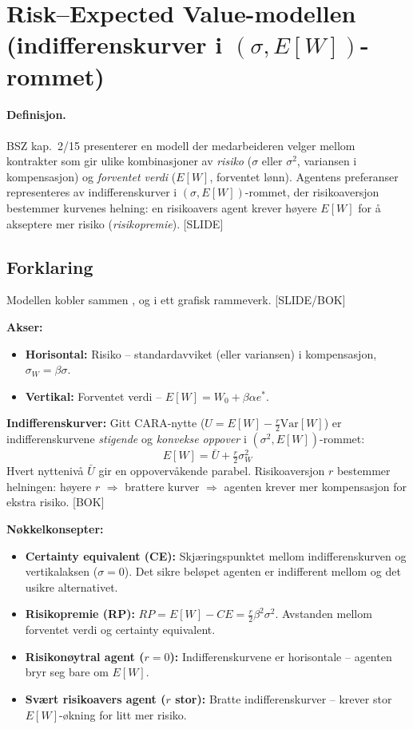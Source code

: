 \section{Risk--Expected Value-modellen (indifferenskurver i $(\sigma, E[W])$-rommet)}\label{thr:risk-expected-value-model}

\paragraph{Definisjon.} BSZ kap.\ 2/15 presenterer en modell der medarbeideren velger mellom kontrakter som gir ulike kombinasjoner av \emph{risiko} ($\sigma$ eller $\sigma^2$, variansen i kompensasjon) og \emph{forventet verdi} ($E[W]$, forventet lønn). Agentens preferanser representeres av indifferenskurver i $(\sigma, E[W])$-rommet, der risikoaversjon bestemmer kurvenes helning: en risikoavers agent krever høyere $E[W]$ for å akseptere mer risiko (\emph{risikopremie}). [SLIDE]

\subsection*{Forklaring}

Modellen kobler sammen ,  og  i ett grafisk rammeverk. [SLIDE/BOK]

\textbf{Akser:}
\begin{itemize}\setlength{\itemsep}{1pt}
\item \textbf{Horisontal:} Risiko -- standardavviket (eller variansen) i kompensasjon, $\sigma_W = \beta\sigma$.
\item \textbf{Vertikal:} Forventet verdi -- $E[W] = W_0 + \beta\alpha e^*$.
\end{itemize}

\textbf{Indifferenskurver:} Gitt CARA-nytte ($U = E[W] - \tfrac{r}{2}\mathrm{Var}[W]$) er indifferenskurvene \emph{stigende} og \emph{konvekse oppover} i $(\sigma^2, E[W])$-rommet:
\[
E[W] = \bar{U} + \tfrac{r}{2}\sigma_W^2
\]
Hvert nyttenivå $\bar{U}$ gir en oppovervåkende parabel. Risikoaversjon $r$ bestemmer helningen: høyere $r$ $\Rightarrow$ brattere kurver $\Rightarrow$ agenten krever mer kompensasjon for ekstra risiko. [BOK]

\textbf{Nøkkelkonsepter:}
\begin{itemize}\setlength{\itemsep}{2pt}
\item \textbf{Certainty equivalent (CE):} Skjæringspunktet mellom indifferenskurven og vertikalaksen ($\sigma=0$). Det sikre beløpet agenten er indifferent mellom og det usikre alternativet.
\item \textbf{Risikopremie (RP):} $RP = E[W] - CE = \tfrac{r}{2}\beta^2\sigma^2$. Avstanden mellom forventet verdi og certainty equivalent.
\item \textbf{Risikonøytral agent ($r=0$):} Indifferenskurvene er horisontale -- agenten bryr seg bare om $E[W]$.
\item \textbf{Svært risikoavers agent ($r$ stor):} Bratte indifferenskurver -- krever stor $E[W]$-økning for litt mer risiko.
\end{itemize}

